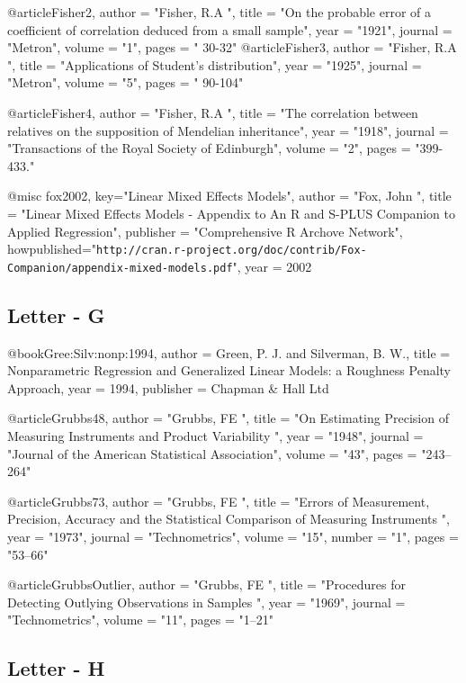 @article{Fisher2,
	author = "Fisher, R.A ",
	title = "On the probable error of a coefficient of correlation deduced from a small sample",
	year = "1921",
	journal = "Metron",
	volume = "1",
	pages = " 30-32"
}
@article{Fisher3,
	author = "Fisher, R.A ",
	title = "Applications of Student's distribution",
	year = "1925",
	journal = "Metron",
	volume = "5",
	pages = " 90-104"
}


@article{Fisher4,
	author = "Fisher, R.A ",
	title = "The correlation between relatives on the supposition of Mendelian inheritance",
	year = "1918",
	journal = "Transactions of the Royal Society of Edinburgh",
	volume = "2",
	pages = "399-433."
}


@misc {fox2002,
	key="Linear Mixed Effects Models",
	author = "Fox, John ",
	title = "Linear Mixed Effects Models  - Appendix to An R and S-PLUS Companion to Applied Regression",
	publisher = "Comprehensive R Archove Network",
	howpublished="\texttt{http://cran.r-project.org/doc/contrib/Fox-Companion/appendix-mixed-models.pdf}",
	year = 2002
}



\subsection*{Letter - G}

@book{Gree:Silv:nonp:1994,
	author = {Green, P. J. and Silverman, B. W.},
	title = {Nonparametric Regression and Generalized Linear Models: a Roughness Penalty Approach},
	year = {1994},
	publisher = {Chapman \& Hall Ltd}
}


@article{Grubbs48,
	author = "Grubbs, FE ",
	title = "On Estimating Precision of Measuring Instruments and Product Variability ",
	year = "1948",
	journal = "Journal of the American Statistical Association",
	volume = "43",
	pages = "243--264"
}

@article{Grubbs73,
	author = "Grubbs, FE ",
	title = "Errors of Measurement, Precision, Accuracy and the Statistical Comparison of Measuring Instruments ",
	year = "1973",
	journal = "Technometrics",
	volume = "15",
	number = "1",
	pages = "53--66"
}






@article{GrubbsOutlier,
	author = "Grubbs, FE ",
	title = "Procedures for Detecting Outlying Observations in Samples ",
	year = "1969",
	journal = "Technometrics",
	volume = "11",
	pages = "1--21"
}

\subsection*{Letter - H}

